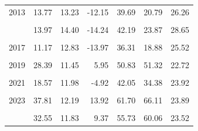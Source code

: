 \begin{table}[!h]
\begin{tabular}[t]{rrrrrrr}
2013 & 13.77 & 13.23 & -12.15 & 39.69 & 20.79 & 26.26\\
\cellcolor{gray!10}{2014} & \cellcolor{gray!10}{22.25} & \cellcolor{gray!10}{13.28} & \cellcolor{gray!10}{-3.79} & \cellcolor{gray!10}{48.28} & \cellcolor{gray!10}{38.29} & \cellcolor{gray!10}{26.42}\\
\addlinespace
2015 & 13.97 & 14.40 & -14.24 & 42.19 & 23.87 & 28.65\\
\cellcolor{gray!10}{2016} & \cellcolor{gray!10}{23.49} & \cellcolor{gray!10}{13.49} & \cellcolor{gray!10}{-2.95} & \cellcolor{gray!10}{49.94} & \cellcolor{gray!10}{40.76} & \cellcolor{gray!10}{26.77}\\
2017 & 11.17 & 12.83 & -13.97 & 36.31 & 18.88 & 25.52\\
\cellcolor{gray!10}{2018} & \cellcolor{gray!10}{22.52} & \cellcolor{gray!10}{12.05} & \cellcolor{gray!10}{-1.10} & \cellcolor{gray!10}{46.14} & \cellcolor{gray!10}{40.28} & \cellcolor{gray!10}{23.95}\\
2019 & 28.39 & 11.45 & 5.95 & 50.83 & 51.32 & 22.72\\
\addlinespace
\cellcolor{gray!10}{2020} & \cellcolor{gray!10}{28.48} & \cellcolor{gray!10}{9.81} & \cellcolor{gray!10}{9.26} & \cellcolor{gray!10}{47.70} & \cellcolor{gray!10}{45.99} & \cellcolor{gray!10}{19.23}\\
2021 & 18.57 & 11.98 & -4.92 & 42.05 & 34.38 & 23.92\\
\cellcolor{gray!10}{2022} & \cellcolor{gray!10}{18.59} & \cellcolor{gray!10}{12.85} & \cellcolor{gray!10}{-6.59} & \cellcolor{gray!10}{43.77} & \cellcolor{gray!10}{30.01} & \cellcolor{gray!10}{25.39}\\
2023 & 37.81 & 12.19 & 13.92 & 61.70 & 66.11 & 23.89\\
\cellcolor{gray!10}{2024} & \cellcolor{gray!10}{19.29} & \cellcolor{gray!10}{12.90} & \cellcolor{gray!10}{-6.00} & \cellcolor{gray!10}{44.59} & \cellcolor{gray!10}{33.37} & \cellcolor{gray!10}{25.65}\\
\addlinespace
2025 & 32.55 & 11.83 & 9.37 & 55.73 & 60.06 & 23.52\\
\bottomrule
\end{tabular}
\end{table}
